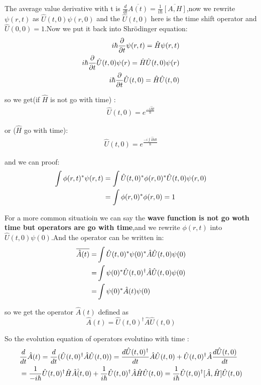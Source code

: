 \documentclass{article}
\begin{document}
  The average value derivative with t is $\frac{d}{dt}\overline{A(t)}=\frac1{i\hbar}\overline{[A,H]}$,now we rewrite $\psi(r,t)$ as $\hat U(t,0)\psi(r,0)$ and the $\hat U(t,0)$ here is the time shift operator and $\hat U(0,0)=1$.Now we put it back into Shr\"odinger equation:
  \begin{align}
  i\hbar\frac{ \partial} { \partial t}\psi(r,t)=\hat H\psi(r,t) \notag \\
  i\hbar\frac{ \partial }{ \partial t}\hat U(t,0)\psi(r)=\hat H\hat U(t,0)\psi(r) \notag \\
i\hbar\frac{ \partial }{ \partial t}\hat U(t,0)=\hat H\hat U(t,0) \notag 
  \end{align}

  so we get(if $\hat H$ is not go with time) :
  \begin{align}
    \hat U(t,0)=e^{\frac{-i\hat Ht}{\hbar}}
  \end{align}

  or ($\hat H$ go with time):
  \begin{align}
    \hat U(t,0)=e^{\frac{-i\int \hat Hdt}{\hbar}}
  \end{align}

  and we can proof:
  \begin{align} 
    \int\phi(r,t)^*\psi(r,t)&=\int\hat U(t,0)^*\phi(r,0)^*\hat U(t,0)\psi(r,0) \notag \\
                            &=\int \phi(r,0)^*\phi(r,0)=1
  \end{align}

  For a more common situatioin we can say the \textbf{wave function is not go woth time but operators are go with time},and we rewrite $\phi(r,t)$ into $\hat U(t,0)\psi(0)$.And the operator can be written in:
  \begin{align}
    \overline{\hat A(t)}=&\int \hat U(t,0)^*\psi(0)^*\hat A\hat U(t,0)\psi(0) \notag \\
    =&\int \psi(0)^*\hat U(t,0)^{\dagger}\hat A\hat U(t,0)\psi(0) \notag \notag \\
    =&\int \psi(0)^*\hat A(t)\psi(0) \notag
  \end{align}

   so we get the operator $\hat A(t)$ defined as 
   \begin{equation}
     \hat A(t)=\hat U(t,0)^{\dagger}\hat A\hat U(t,0)
   \end{equation}

   So the evolution equation of operators evolutino with time :
   \begin{align}
   &  \frac{d}{dt}\hat A(t)=\frac{d}{dt}(\hat U(t,0)^{\dagger}\hat A\hat U(t,0))=\frac{d \hat U(t,0)^{\dagger}}{dt}\hat A\hat U(t,0)+\hat U(t,0)^{\dagger}\hat A\frac{ d\hat U(t,0)}{dt} \notag \\
   &=\frac1{-i\hbar}\hat U(t,0)^{\dagger}\hat H\hat A\hat(t,0)+\frac1{i\hbar}\hat U(t,0)^{\dagger}\hat A\hat H\hat U(t,0)=\frac1{i\hbar}\hat U(t,0)^{\dagger}[\hat A,\hat H]\hat U(t,0) \notag
   \end{align}
\end{document}
